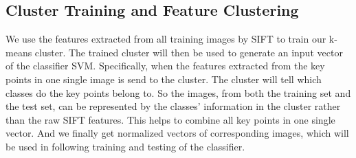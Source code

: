 \subsection{Cluster Training and Feature Clustering}
We use the features extracted from all training images by SIFT to train our k-means cluster. 
The trained cluster will then be used to generate an input vector of the classifier SVM.
Specifically, when the features extracted from the key points in one single image is send to the cluster. 
The cluster will tell which classes do the key points belong to.
So the images, from both the training set and the test set, can be represented by the classes' information in the cluster rather than the raw SIFT features.
This helps to combine all key points in one single vector.
And we finally get normalized vectors of corresponding images, which will be used in following training and testing of the classifier.